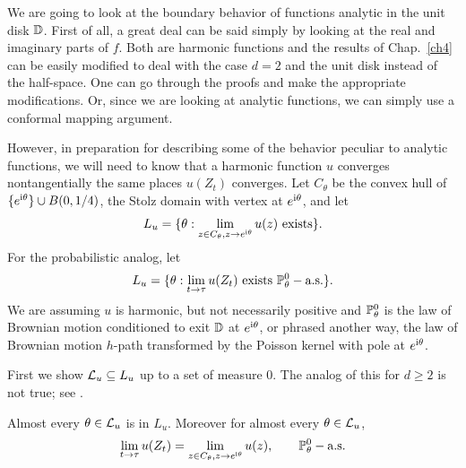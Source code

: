 
We are going to look at the boundary behavior of functions analytic in the unit disk $\D$. First of all, a great deal can be said simply by looking at the real and imaginary parts of $f$. Both are harmonic functions and the results of Chap.\ \ref{ch4} can be easily modified to deal with the case $d = 2$ and the unit disk instead of the half-space. One can go through the proofs and make the appropriate modifications. Or, since we are looking at analytic functions, we can simply use a conformal mapping argument.

However, in preparation for describing some of the behavior peculiar to analytic functions, we will need to know that a harmonic function $u$ converges nontangentially the same places $u(Z_t)$ converges. Let $C_\theta$ be the convex hull of $\{e^{\im\theta}\} \cup B(0,1/4)$, the Stolz domain with vertex at $e^{\im\theta}$, and let
\begin{equation}\label{eq:ch5_3.1}
    L_u = \{\theta : \lim_{z \in C_\theta, z \to e^{\im\theta}} u(z)~\text{exists}\}.
\end{equation}
For the probabilistic analog, let
\begin{equation}\label{eq:ch5_3.2}
    L_u = \{\theta : \lim_{t \to \tau} u(Z_t)~\text{exists}~\P_\theta^0-\text{a.s.}\}.
\end{equation}
We are assuming $u$ is harmonic, but not necessarily positive and $\P_\theta^0$ is the law of Brownian motion conditioned to exit $\D$ at $e^{\im\theta}$, or phrased another way, the law of Brownian motion $h$-path transformed by the Poisson kernel with pole at $e^{\im\theta}$.

\mpagebreak

First we show $\LC_u\subseteq L_u$ up to a set of measure $0$. The analog of this for $d\ge 2$ is not true; see \cite{Durrett1984}.

\begin{proposition}\label{prop:ch5_3.1}
Almost every $\theta \in \LC_u$ is in $L_u$. Moreover for almost every $\theta \in \LC_u$,
\[
    \lim_{t\to\tau} u(Z_t) = \lim_{z\in C_\theta,z\to e^{\im\theta}} u(z), \qquad \P_\theta^0-\text{a.s.}
\]
\end{proposition}

